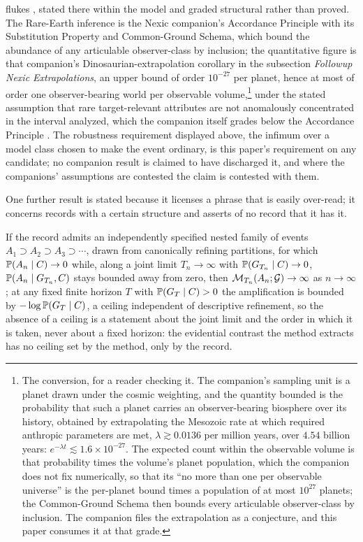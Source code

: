 flukes \cite{GoldenRouteWorld}, stated there within the model and graded
structural rather than proved. The Rare-Earth inference is the Nexic
companion's Accordance Principle with its Substitution Property and
Common-Ground Schema, which bound the abundance of any articulable
observer-class by inclusion; the quantitative figure is that companion's
Dinosaurian-extrapolation corollary in the subsection \emph{Followup Nexic
Extrapolations}, an upper bound of order $10^{-27}$ per planet, hence at
most of order one observer-bearing world per observable volume,\footnote{The
conversion, for a reader checking it. The companion's sampling unit is a
planet drawn under the cosmic weighting, and the quantity bounded is the
probability that such a planet carries an observer-bearing biosphere over
its history, obtained by extrapolating the Mesozoic rate at which required
anthropic parameters are met, $\lambda \gtrsim 0.0136$ per million years,
over $4.54$ billion years: $e^{-\lambda t} \lesssim 1.6 \times 10^{-27}$.
The expected count within the observable volume is that probability times
the volume's planet population, which the companion does not fix
numerically, so that its ``no more than one per observable universe'' is
the per-planet bound times a population of at most $10^{27}$ planets; the
Common-Ground Schema then bounds every articulable observer-class by
inclusion. The companion files the extrapolation as a conjecture, and this
paper consumes it at that grade.} under the stated assumption that rare
target-relevant attributes are not anomalously concentrated in the interval
analyzed, which the companion itself grades below the Accordance Principle
\cite{Nexus}.
The robustness requirement displayed above, the infimum over a model class
chosen to make the event ordinary, is this paper's requirement on any
candidate; no companion result is claimed to have discharged it, and where
the companions' assumptions are contested the claim is contested with them.

One further result is stated because it licenses a phrase that is easily
over-read; it concerns records with a certain structure and asserts of no
record that it has it.

\begin{proposition}\label{prop:nested}
If the record admits an independently specified nested family of events
$A_1\supset A_2\supset A_3\supset\cdots$, drawn from canonically refining
partitions, for which $\mathbb{P}(A_n \mid C) \to 0$ while, along a joint limit $T_n \to \infty$ with $\mathbb{P}(G_{T_n} \mid C) \to 0$, $\mathbb{P}(A_n \mid G_{T_n}, C)$ stays bounded away from zero, then $\mathcal{M}_{T_n}(A_n;\mathcal{G}) \to \infty$ as $n \to \infty$; at any fixed finite horizon $T$ with $\mathbb{P}(G_T \mid C) > 0$ the amplification is bounded by $-\log \mathbb{P}(G_T \mid C)$, a ceiling independent of descriptive refinement, so the absence of a ceiling is a statement about the joint limit and the order in which it is taken, never about a fixed horizon:
the evidential contrast the method extracts has no ceiling set by the
method, only by the record.
\end{proposition}

